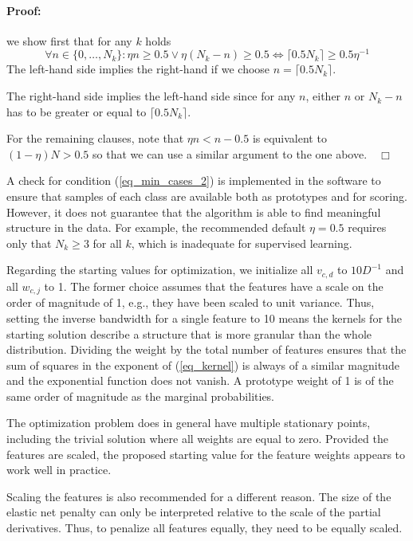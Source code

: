 \paragraph{Proof:} we show first that for any $k$ holds
%
\begin{equation}
\forall n\in\{0,\dots,N_k\}:\eta n\geq0.5\vee\eta(N_k-n)\geq0.5\iff\lceil0.5N_k\rceil\geq0.5\eta^{-1}\label{eq_condition_proof}
\end{equation}
%
The left-hand side implies the right-hand if we choose $n=\lceil0.5N_k\rceil$.\par
%
The right-hand side implies the left-hand side since for any $n$, either $n$ or $N_k-n$ has to be greater or equal to $\lceil0.5N_k\rceil$.\par
%
For the remaining clauses, note that $\eta n<n-0.5$ is equivalent to $(1-\eta)N>0.5$ so that we can use a similar argument to the one above.$\quad\Box$\par
%
A check for condition (\ref{eq_min_cases_2}) is implemented in the software to ensure that samples of each class are available both as prototypes and for scoring.
However, it does not guarantee that the algorithm is able to find meaningful structure in the data.
For example, the recommended default $\eta=0.5$ requires only that $N_k\geq3$ for all $k$, which is inadequate for supervised learning.\par
%
Regarding the starting values for optimization, we initialize all $v_{c,d}$ to $10D^{-1}$ and all $w_{c,j}$ to 1.
The former choice assumes that the features have a scale on the order of magnitude of 1, e.g., they have been scaled to unit variance.
Thus, setting the inverse bandwidth for a single feature to 10 means the kernels for the starting solution describe a structure that is more granular than the whole distribution.
Dividing the weight by the total number of features ensures that the sum of squares in the exponent of (\ref{eq_kernel}) is always of a similar magnitude and the exponential function does not vanish.
A prototype weight of 1 is of the same order of magnitude as the marginal probabilities.
%
\begin{remark}
The optimization problem does in general have multiple stationary points, including the trivial solution where all weights are equal to zero.
Provided the features are scaled, the proposed starting value for the feature weights appears to work well in practice.\par
%
Scaling the features is also recommended for a different reason.
The size of the elastic net penalty can only be interpreted relative to the scale of the partial derivatives.
Thus, to penalize all features equally, they need to be equally scaled.
\end{remark}
